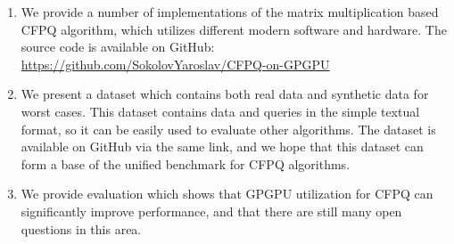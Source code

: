 \begin{enumerate}
\item We provide a number of implementations of the matrix multiplication based CFPQ algorithm, which utilizes different modern software and hardware.
The source code is available on GitHub: \href{https://github.com/SokolovYaroslav/CFPQ-on-GPGPU}{https://github.com/SokolovYaroslav/CFPQ-on-GPGPU}
\item We present a dataset which contains both real data and synthetic data for worst cases.
This dataset contains data and queries in the simple textual format, so it can be easily used to evaluate other algorithms.
The dataset is available on GitHub via the same link, and we hope that this dataset can form a base of the unified benchmark for CFPQ algorithms.
\item We provide evaluation which shows that GPGPU utilization for CFPQ can significantly improve performance, and that there are still many open questions in this area.
\end{enumerate}
